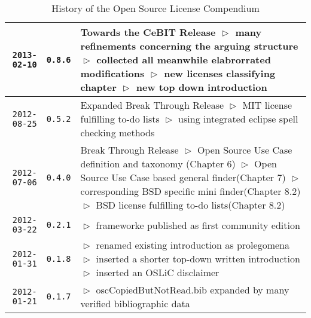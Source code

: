 \begin{table}
\footnotesize
\caption{History of the Open Source License Compendium}
\begin{center}
\begin{tabular}{|r|c|p{10cm}|}
\hline
\hline
    \texttt{2013-02-10}
  & \texttt{0.8.6} 
  & Towards the CeBIT Release\newline
    $\vartriangleright$ many refinements concerning the arguing structure\newline
    $\vartriangleright$ collected all meanwhile elabrorrated modifications\newline
    $\vartriangleright$ new licenses classifying chapter\newline   
    $\vartriangleright$ new top down introduction\newline
    \\
\hline
    \texttt{2012-08-25}
  & \texttt{0.5.2} 
  & Expanded Break Through Release\newline
    $\vartriangleright$ MIT license fulfilling to-do lists\newline
    $\vartriangleright$ using integrated eclipse spell checking methods\newline
    \\
\hline
    \texttt{2012-07-06}
  & \texttt{0.4.0} 
  & Break Through Release\newline
    $\vartriangleright$ Open Source Use Case definition and taxonomy
    (Chapter 6)\newline 
    $\vartriangleright$ Open Source Use Case based general finder(Chapter
    7)\newline 
    $\vartriangleright$ corresponding BSD specific mini finder(Chapter
    8.2)\newline 
    $\vartriangleright$ BSD license fulfilling to-do lists(Chapter 8.2)\\
\hline
    \texttt{2012-03-22}
  & \texttt{0.2.1} 
  & $\vartriangleright$ frameworke published as first community edition\\
\hline
    \texttt{2012-01-31}
  & \texttt{0.1.8} 
  & $\vartriangleright$ renamed existing introduction as prolegomena\newline
    $\vartriangleright$ inserted a shorter top-down written introduction\newline
    $\vartriangleright$ inserted an OSLiC disclaimer\\
\hline
    \texttt{2012-01-21}
  & \texttt{0.1.7} 
  & $\vartriangleright$ oscCopiedButNotRead.bib expanded by many verified
  bibliographic data \newline 

\end{tabular}
\end{center}
\end{table}
